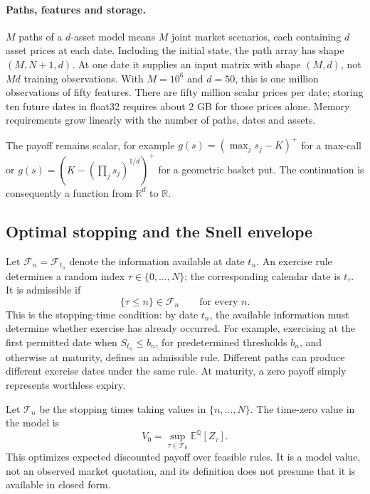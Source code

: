\documentclass[11pt,a4paper]{article}
\newcommand{\E}{\mathbb E^{\mathbb Q}}
\newcommand{\R}{\mathbb R}
\begin{document}
\paragraph{Paths, features and storage.}
$M$ paths of a $d$-asset model means $M$ joint market scenarios, each containing
$d$ asset prices at each date. Including the initial state, the path array has
shape $(M,N+1,d)$. At one date it supplies an input matrix with shape $(M,d)$,
not $Md$ training observations. With $M=10^6$ and $d=50$, this is one million
observations of fifty features. There are fifty million scalar prices per date;
storing ten future dates in float32 requires about $2$ GB for those prices alone.
Memory requirements grow linearly with the number of paths, dates and assets.

The payoff remains scalar, for example
$g(s)=(\max_j s_j-K)^+$ for a max-call or
$g(s)=(K-(\prod_j s_j)^{1/d})^+$ for a geometric basket put.
The continuation is consequently a function from $\R^d$ to $\R$.

\subsection{Optimal stopping and the Snell envelope}
Let $\mathcal F_n=\mathcal F_{t_n}$ denote the information available at date $t_n$.
An exercise rule determines a random index $\tau\in\{0,\ldots,N\}$;
the corresponding calendar date is $t_\tau$. It is admissible if
\begin{equation}
 \{\tau\leq n\}\in\mathcal F_n\qquad\text{for every }n.
\end{equation}
This is the stopping-time condition: by date $t_n$, the available information
must determine whether exercise has already occurred.
For example, exercising at the first permitted date when $S_{t_n}\leq b_n$,
for predetermined thresholds $b_n$, and otherwise at maturity, defines an
admissible rule. Different paths can produce different exercise dates under
the same rule. At maturity, a zero payoff simply represents worthless expiry.

Let $\mathcal T_n$ be the stopping times taking values in $\{n,\ldots,N\}$.
The time-zero value in the model is
\begin{equation}\label{eq:v0}
 V_0=\sup_{\tau\in\mathcal T_0}\E[Z_\tau].
\end{equation}
This optimizes expected discounted payoff over feasible rules. It is a
model value, not an observed market quotation, and its definition does not
presume that it is available in closed form.
\end{document}
